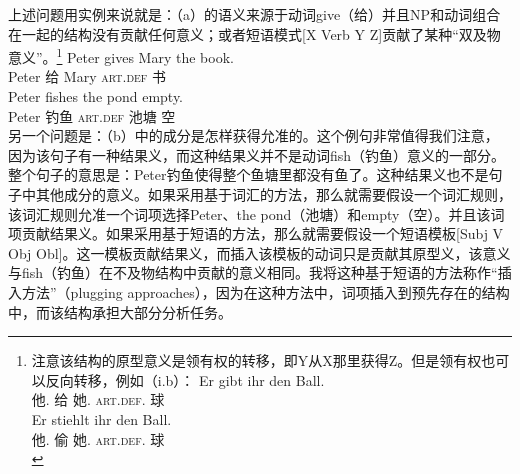 上述问题用实例来说就是：（a）的语义来源于动词give（给）并且NP和动词组合在一起的结构没有贡献任何意义；或者短语模式[X Verb Y Z]贡献了某种“双及物意义”。\footnote{%
注意该结构的原型意义是领有权的转移，即Y从X那里获得Z。但是领有权也可以反向转移，例如（i.b）：
\eal
\ex 
\gll Er gibt ihr den Ball.\\
     他.\nom{} 给 她.\dat{} \textsc{art}.\textsc{def}.\acc{} 球\\
\ex
\gll Er stiehlt ihr den Ball.\\
     他.\nom{} 偷  她.\dat{} \textsc{art}.\textsc{def}.\acc{} 球\\
\zllast
}
\eal
\ex 
\gll Peter gives Mary the book.\\
      Peter 给 Mary \textsc{art}.\textsc{def} 书\\
\ex 
\gll Peter fishes the pond empty.\\
Peter 钓鱼 \textsc{art}.\textsc{def} 池塘 空\\
\zl
另一个问题是：（b）中的成分是怎样获得允准的。这个例句非常值得我们注意，因为该句子有一种结果义，而这种结果义并不是动词fish（钓鱼）意义的一部分。整个句子的意思是：Peter钓鱼使得整个鱼塘里都没有鱼了。这种结果义也不是句子中其他成分的意义。如果采用基于词汇的方法，那么就需要假设一个词汇规则，该词汇规则允准一个词项选择Peter、the pond（池塘）和empty（空）。并且该词项贡献结果义。如果采用基于短语的方法，那么就需要假设一个短语模板[Subj V Obj Obl]。这一模板贡献结果义，而插入该模板的动词只是贡献其原型义，该意义与fish（钓鱼）在不及物结构中贡献的意义相同。我将这种基于短语的方法称作“插入方法”（plugging approaches），因为在这种方法中，词项插入到预先存在的结构中，而该结构承担大部分分析任务。
